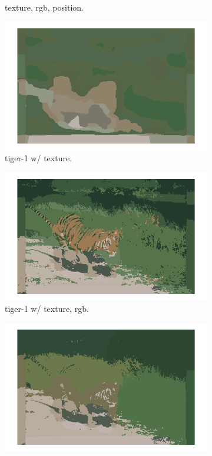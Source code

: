 \documentclass[12pt]{report}
\begin{document}
\begin{enumerate}
\begin{figure}[H]
\begin{subfigure}{0.3\linewidth}
      \caption{ texture, rgb, position.}
    \end{subfigure}
    \begin{subfigure}{0.3\linewidth}
      \includegraphics[width=\linewidth]{p1img2c.png}
      \caption{tiger-1 w/ texture.}
    \end{subfigure}
    \begin{subfigure}{0.3\linewidth}
      \includegraphics[width=\linewidth]{p2img2c.png}
      \caption{tiger-1 w/ texture, rgb.}
    \end{subfigure}
    \begin{subfigure}{0.3\linewidth}
      \includegraphics[width=\linewidth]{p3img2c.png}

\end{subfigure}
\end{figure}
\end{enumerate}
\end{document}
